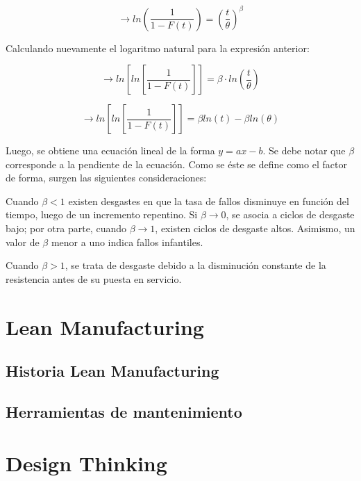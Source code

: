 \begin{equation}
\rightarrow ln\left( \frac{1}{1-F(t)} \right)=\left( \frac{t}{\theta}\right)^\beta 
\end{equation}

Calculando nuevamente el logaritmo natural para la expresión anterior:

\begin{equation}
\rightarrow ln\left[ln\left[\frac{1}{1-F(t)}\right]\right]=\beta\cdot ln\left(\frac{t}{\theta}\right)
\end{equation}

\begin{equation}
\rightarrow ln\left[ln\left[\frac{1}{1-F(t)}\right]\right]=\beta ln(t)-\beta ln(\theta)
\end{equation}

Luego, se obtiene una ecuación lineal de la forma $y=ax-b$. Se debe notar que $\beta$ corresponde a la pendiente de la ecuación. Como se éste se define como el factor de forma, surgen las siguientes consideraciones:

\begin{description}
\item Cuando $\beta<1$ existen desgastes en que la tasa de fallos disminuye en función del tiempo, luego de un incremento repentino. Si $\beta\rightarrow0$, se asocia a ciclos de desgaste bajo; por otra parte, cuando $\beta\rightarrow1$, existen ciclos de desgaste altos. Asimismo, un valor de $\beta$ menor a uno indica fallos infantiles.
\item Cuando $\beta>1$, se trata de desgaste debido a la disminución constante de la resistencia antes de su puesta en servicio.
\end{description}


\section{Lean Manufacturing}

\subsection{Historia Lean Manufacturing}

\subsection{Herramientas de mantenimiento}

\section{Design Thinking}

